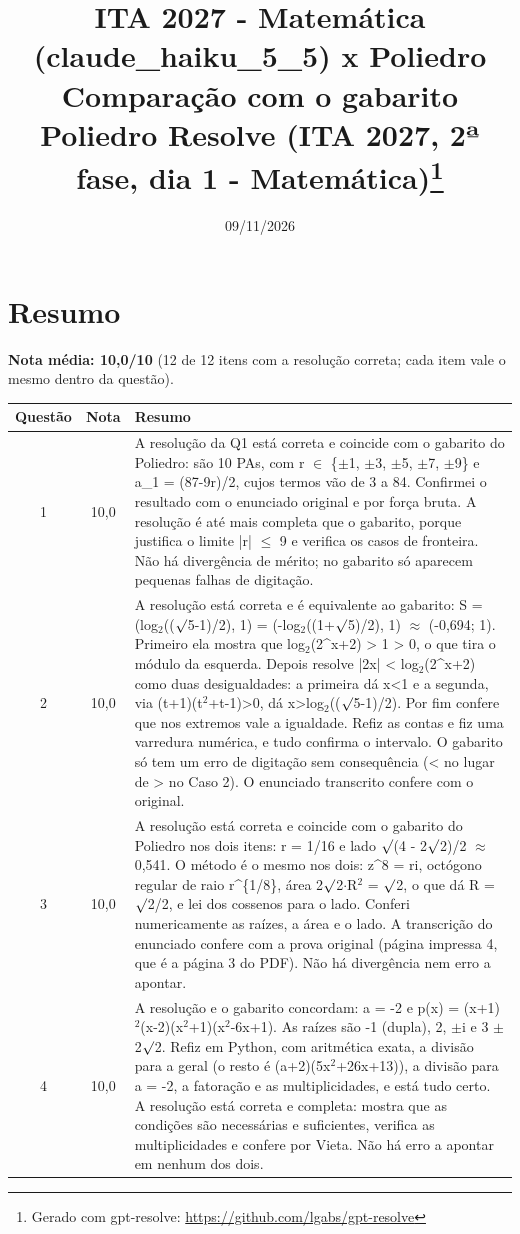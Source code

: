\documentclass{article}%
\title{ITA 2027 {-} Matemática (claude\_haiku\_5\_5) x Poliedro\\[4pt]\large Comparação com o gabarito Poliedro Resolve (ITA 2027, 2ª fase, dia 1 {-} Matemática)\thanks{Gerado com gpt-resolve: \url{https://github.com/lgabs/gpt-resolve}}}%
\date{09/11/2026}%
\begin{document}
%
\normalsize%
\maketitle%
\section*{Resumo}\textbf{Nota média: 10,0/10} (12 de 12 itens com a resolução correta; cada item vale o mesmo dentro da questão).\par\medskip%
\begin{longtable}{@{}c c p{}@{}}\toprule Questão & Nota & Resumo \\ \midrule
1 & 10,0 & A resolução da Q1 está correta e coincide com o gabarito do Poliedro: são 10 PAs, com r $\in$ \{$\pm$1, $\pm$3, $\pm$5, $\pm$7, $\pm$9\} e a\_1 = (87-9r)/2, cujos termos vão de 3 a 84. Confirmei o resultado com o enunciado original e por força bruta. A resolução é até mais completa que o gabarito, porque justifica o limite |r| $\leq$ 9 e verifica os casos de fronteira. Não há divergência de mérito; no gabarito só aparecem pequenas falhas de digitação. \\
2 & 10,0 & A resolução está correta e é equivalente ao gabarito: S = (log$_{2}$(($\surd$5-1)/2), 1) = (-log$_{2}$((1+$\surd$5)/2), 1) $\approx$ (-0,694; 1). Primeiro ela mostra que log$_{2}$(2\^{}x+2) > 1 > 0, o que tira o módulo da esquerda. Depois resolve |2x| < log$_{2}$(2\^{}x+2) como duas desigualdades: a primeira dá x<1 e a segunda, via (t+1)(t$^2$+t-1)>0, dá x>log$_{2}$(($\surd$5-1)/2). Por fim confere que nos extremos vale a igualdade. Refiz as contas e fiz uma varredura numérica, e tudo confirma o intervalo. O gabarito só tem um erro de digitação sem consequência (< no lugar de > no Caso 2). O enunciado transcrito confere com o original. \\
3 & 10,0 & A resolução está correta e coincide com o gabarito do Poliedro nos dois itens: r = 1/16 e lado $\surd$(4 - 2$\surd$2)/2 $\approx$ 0,541. O método é o mesmo nos dois: z\^{}8 = ri, octógono regular de raio r\^{}\{1/8\}, área 2$\surd$2$\cdot$R$^2$ = $\surd$2, o que dá R = $\surd$2/2, e lei dos cossenos para o lado. Conferi numericamente as raízes, a área e o lado. A transcrição do enunciado confere com a prova original (página impressa 4, que é a página 3 do PDF). Não há divergência nem erro a apontar. \\
4 & 10,0 & A resolução e o gabarito concordam: a = -2 e p(x) = (x+1)$^2$(x-2)(x$^2$+1)(x$^2$-6x+1). As raízes são -1 (dupla), 2, $\pm$i e 3 $\pm$ 2$\surd$2. Refiz em Python, com aritmética exata, a divisão para a geral (o resto é (a+2)(5x$^2$+26x+13)), a divisão para a = -2, a fatoração e as multiplicidades, e está tudo certo. A resolução está correta e completa: mostra que as condições são necessárias e suficientes, verifica as multiplicidades e confere por Vieta. Não há erro a apontar em nenhum dos dois. \\

\end{longtable}
\end{document}
